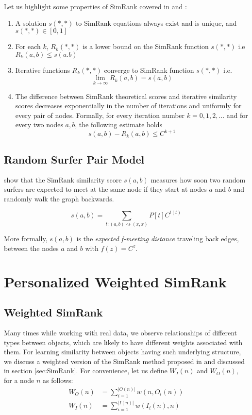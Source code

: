Let us highlight some properties of SimRank covered in \citep{Jeh02simrank} and \citep{LizorkinSimrank}:
\begin{enumerate}
\item A solution $s(\ast,\ast)$ to SimRank equations always exist and is unique, and $s(\ast,\ast) \in [0,1]$
\item For each $k$, $R_k(\ast,\ast)$ is a lower bound on the SimRank function $s(\ast,\ast)$ i.e $R_k(a,b) \leq s(a.b)$
\item Iterative functions $R_k(\ast,\ast)$ converge to SimRank function $s(\ast,\ast)$ i.e. 
\begin{equation}
\displaystyle \lim_{k \rightarrow \infty}R_k(a,b)=s(a,b)
\end{equation}
\item The difference between SimRank theoretical scores and iterative similarity scores decreases exponentially in the number of iterations and uniformly for every pair of nodes. Formally, for every iteration number $k=0,1,2,\ldots$ and for every two nodes $a,b$, the following estimate holds
\begin{equation} \label{SimRankExponentialConvergence}
s(a,b) - R_k(a,b) \leq C^{k+1}
\end{equation}
\end{enumerate}

\subsection{Random Surfer Pair Model}
\citep{Jeh02simrank} show that the SimRank similarity score $s(a,b)$ measures how soon two random surfers are expected to meet at the same node if they start at nodes $a$ and $b$ and randomly walk the graph backwards.

\begin{equation}
s(a,b) = \sum_{t:(a,b) \rightsquigarrow (x,x)} P[t]C^{l(t)}  \label{eq:emd} 
\end{equation}

More formally, $s(a,b)$ is the \textit{expected f-meeting distance} traveling back edges, between the nodes $a$ and $b$ with $f(z)=C^z$.

\section{Personalized Weighted SimRank}
\subsection{Weighted SimRank}
Many times while working with real data, we observe relationships of different types between objects, which are likely to have different weights associated with them. For learning similarity between objects having such underlying structure, we discuss a weighted version of the SimRank method proposed in \citep{Jeh02simrank} and discussed in section \ref{sec:SimRank}. For convenience, let us define $W_{I}(n)$ and $W_{O}(n)$, for a node $n$ as follows:
\begin{align}
W_{O}(n) &= \sum_{i=1}^{|O(n)|} w(n,O_i(n)) \\
W_{I}(n) &= \sum_{i=1}^{|I(n)|} w(I_i(n),n)
\end{align}

